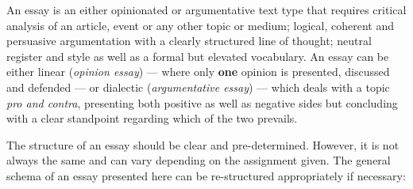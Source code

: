 



\thispagestyle{plain}



An essay is an either opinionated or argumentative text type that requires critical analysis of an article, event or any other topic or medium; logical, coherent and persuasive argumentation with a clearly structured line of thought; neutral register and style as well as a formal but elevated vocabulary. An essay can be either linear (\emph{opinion essay}) --- where only \textbf{one} opinion is presented, discussed and defended --- or dialectic (\emph{argumentative essay}) --- which deals with a topic \emph{pro and contra}, presenting both positive as well as negative sides but concluding with a clear standpoint regarding which of the two prevails. 


The structure of an essay should be clear and pre-determined. However, it is not always the same and can vary depending on the assignment given. The general schema of an essay presented here can be re-structured appropriately if necessary:

